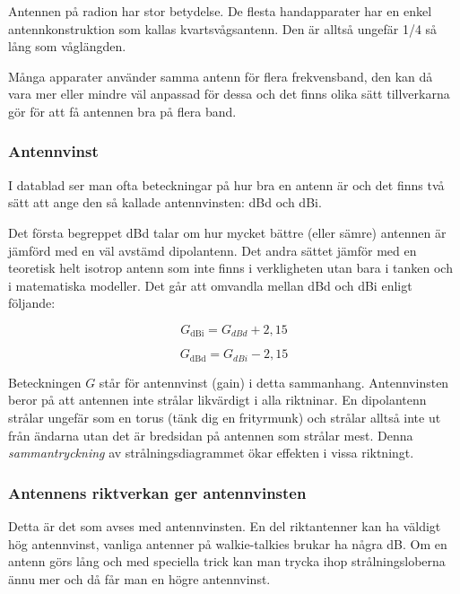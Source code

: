 \documentclass[12ypt,swedish,a4paper]{report}
\begin{document}
Antennen på radion har stor betydelse. De flesta handapparater har en enkel antennkonstruktion som kallas kvartsvågsantenn. Den är alltså ungefär 1/4 så lång som våglängden. 

Många apparater använder samma antenn för flera frekvensband, den kan då vara mer eller mindre väl anpassad för dessa och det finns olika sätt tillverkarna gör för att få antennen bra på flera band.

\subsubsection{Antennvinst}

I datablad ser man ofta beteckningar på hur bra en antenn är och det finns två sätt att ange den så kallade antennvinsten: dBd och dBi.

Det första begreppet dBd talar om hur mycket bättre (eller sämre) antennen är jämförd med en väl avstämd dipolantenn. Det andra sättet jämför med en teoretisk helt isotrop antenn som inte finns i verkligheten utan bara i tanken och i matematiska modeller. Det går att omvandla mellan dBd och dBi enligt följande:

\begin{equation}
G_{\mathrm{dBi}} = G_{dBd} + 2,15
\end{equation}

\begin{equation}
G_{\mathrm{dBd}} = G_{dBi} - 2,15
\end{equation}

Beteckningen $G$ står för antennvinst (gain) i detta sammanhang. Antennvinsten beror på att antennen inte strålar likvärdigt i alla riktninar. En dipolantenn strålar ungefär som en torus (tänk dig en frityrmunk) och strålar alltså inte ut från ändarna utan det är bredsidan på antennen som strålar mest. Denna \textit{sammantryckning} av strålningsdiagrammet ökar effekten i vissa riktningt.

\subsubsection{Antennens riktverkan ger antennvinsten}

Detta är det som avses med antennvinsten. En del riktantenner kan ha väldigt hög antennvinst, vanliga antenner på walkie-talkies brukar ha några dB. Om en antenn görs lång och med speciella trick kan man trycka ihop strålningsloberna ännu mer och då får man en högre antennvinst.
\end{document}
